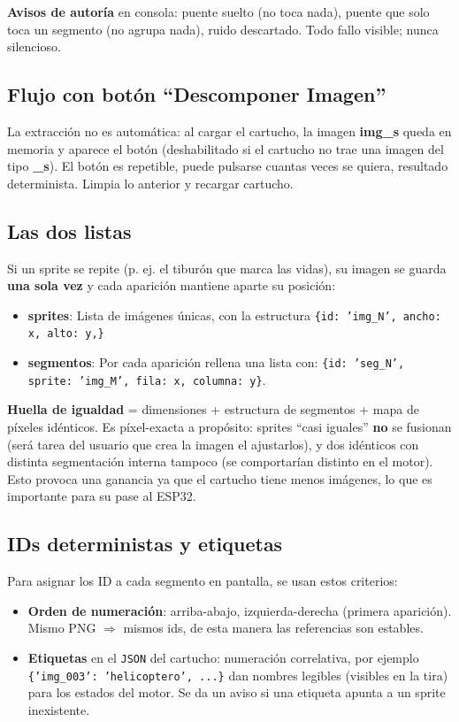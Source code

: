 \textbf{Avisos de autoría} en consola: puente suelto (no toca nada), puente que solo toca un segmento (no agrupa nada), ruido descartado. Todo fallo visible; nunca silencioso.

\subsection{Flujo con botón ``Descomponer Imagen''}

La extracción no es automática: al cargar el cartucho, la imagen \textbf{img\_s} queda en memoria y aparece el botón (deshabilitado si el cartucho no trae una imagen del tipo \textbf{\_s}). El botón es repetible, puede pulsarse cuantas veces se quiera, resultado determinista. Limpia lo anterior y recargar cartucho. 

\subsection{Las dos listas}

Si un sprite se repite (p. ej. el tiburón que marca las vidas), su imagen se guarda \textbf{una sola vez} y cada aparición mantiene aparte su posición:

\begin{itemize}
	\item \textbf{sprites}: Lista de imágenes únicas, con la estructura \texttt{\{id: 'img\_N', ancho: x, alto: y,\}}
	\item \textbf{segmentos}: Por cada aparición rellena una lista con: \texttt{\{id: 'seg\_N', sprite: 'img\_M', fila: x, columna: y\}}.
\end{itemize}
\textbf{Huella de igualdad} = dimensiones + estructura de segmentos + mapa de píxeles idénticos. 
Es píxel-exacta a propósito: sprites ``casi iguales'' \textbf{no} se fusionan (será tarea del usuario que crea la imagen el ajustarlos), y dos idénticos con distinta segmentación interna tampoco (se comportarían distinto en el motor). Esto provoca una ganancia ya que el cartucho tiene menos imágenes, lo que es importante para su pase al ESP32.

\subsection{IDs deterministas y etiquetas}

Para asignar los ID a cada segmento en pantalla, se usan estos criterios:

\begin{itemize}
	\item \textbf{Orden de numeración}: arriba-abajo, izquierda-derecha (primera aparición). Mismo PNG $\Rightarrow$ mismos ids, de esta manera las referencias son estables.
	\item \textbf{Etiquetas} en el \texttt{JSON} del cartucho: numeración correlativa, por ejemplo \texttt{\{'img\_003': 'helicoptero', ...\}} dan nombres legibles (visibles en la tira) para los estados del motor. Se da un aviso si una etiqueta apunta a un sprite inexistente.
\end{itemize}

